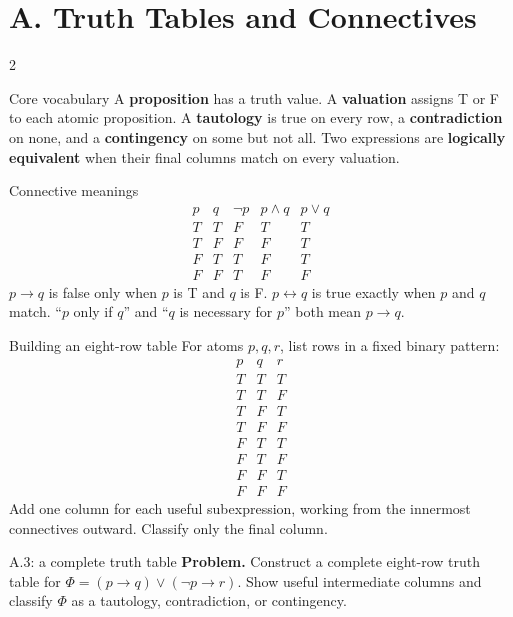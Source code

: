 \documentclass[10pt]{article}
\newcommand{\term}[1]{\textbf{\color{CoreNavy}#1}}
\begin{document}
\small

\section*{A. Truth Tables and Connectives}
\begin{multicols}{2}
\begin{definitionbox}{Core vocabulary}
A \term{proposition} has a truth value. A \term{valuation} assigns T or F to
each atomic proposition. A \term{tautology} is true on every row, a
\term{contradiction} on none, and a \term{contingency} on some but not all.
Two expressions are \term{logically equivalent} when their final columns match
on every valuation.
\end{definitionbox}

\begin{definitionbox}{Connective meanings}
\[
\begin{array}{c|c|c|c|c}
p&q&\neg p&p\land q&p\lor q\\\hline
T&T&F&T&T\\T&F&F&F&T\\F&T&T&F&T\\F&F&T&F&F
\end{array}
\]
$p\to q$ is false only when $p$ is T and $q$ is F. $p\leftrightarrow q$
is true exactly when $p$ and $q$ match. ``$p$ only if $q$'' and ``$q$ is
necessary for $p$'' both mean $p\to q$.
\end{definitionbox}

\begin{methodbox}{Building an eight-row table}
For atoms $p,q,r$, list rows in a fixed binary pattern:
\[
\begin{array}{c|c|c}
p&q&r\\\hline
T&T&T\\T&T&F\\T&F&T\\T&F&F\\
F&T&T\\F&T&F\\F&F&T\\F&F&F
\end{array}
\]
Add one column for each useful subexpression, working from the innermost
connectives outward. Classify only the final column.
\end{methodbox}


\begin{workedbox}{A.3: a complete truth table}
\textbf{Problem.} Construct a complete eight-row truth table for
$\Phi=(p\to q)\lor(\neg p\to r)$. Show useful intermediate columns and
classify $\Phi$ as a tautology, contradiction, or contingency.


\end{workedbox}
\end{multicols}
\end{document}
